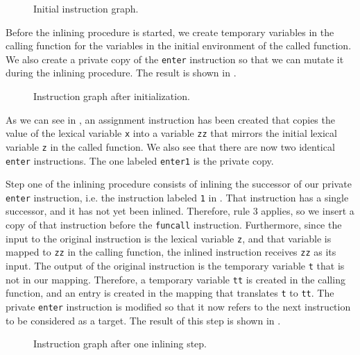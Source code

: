 \begin{figure}
\begin{center}
\end{center}
\caption{\label{fig41}
Initial instruction graph.}
\end{figure}

Before the inlining procedure is started, we create temporary
variables in the calling function for the variables in the initial
environment of the called function.  We also create a private copy of
the \texttt{enter} instruction so that we can mutate it during the
inlining procedure.  The result is shown in .

\begin{figure}
\begin{center}
\end{center}
\caption{\label{fig42}
Instruction graph after initialization.}
\end{figure}

As we can see in , an assignment instruction has been
created that copies the value of the lexical variable \texttt{x} into
a variable \texttt{zz} that mirrors the initial lexical variable
\texttt{z} in the called function.  We also see that there are now two
identical \texttt{enter} instructions.  The one labeled
\texttt{enter1} is the private copy.

Step one of the inlining procedure consists of inlining the successor
of our private \texttt{enter} instruction, i.e. the instruction
labeled \texttt{1} in .  That instruction has a single
successor, and it has not yet been inlined.  Therefore, rule 3
applies, so we insert a copy of that instruction before the
\texttt{funcall} instruction.  Furthermore, since the input to the
original instruction is the lexical variable \texttt{z}, and that
variable is mapped to \texttt{zz} in the calling function, the inlined
instruction receives \texttt{zz} as its input.  The output of the
original instruction is the temporary variable \texttt{t} that is not
in our mapping.  Therefore, a temporary variable \texttt{tt} is
created in the calling function, and an entry is created in the
mapping that translates \texttt{t} to \texttt{tt}.  The private
\texttt{enter} instruction is modified so that it now refers to the
next instruction to be considered as a target.  The result of this
step is shown in .

\begin{figure}
\begin{center}
\end{center}
\caption{\label{fig43}
Instruction graph after one inlining step.}
\end{figure}


